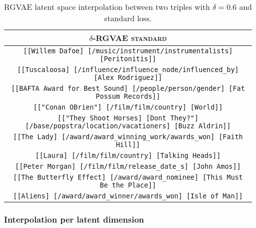 \begin{table}[H]
    \centering
    \begin{tabular}{|c|}
    \hline
    \rowcolor[HTML]{EFEFEF} 
    \textsc{$\delta$-RGVAE standard}\\ \hline
    \texttt{[[Willem Dafoe] [/music/instrument/instrumentalists] [Peritonitis]]}\\
    \texttt{[[Tuscaloosa] [/influence/influence\_node/influenced\_by] [Alex Rodriguez]]}\\
    \texttt{[[BAFTA Award for Best Sound] [/people/person/gender] [Fat Possum Records]]}\\
    \texttt{[["Conan OBrien"] [/film/film/country] [World]]}\\
    \texttt{[["They Shoot Horses] [Dont They?"] [/base/popstra/location/vacationers] [Buzz Aldrin]]}\\
    \texttt{[[The Lady] [/award/award\_winning\_work/awards\_won] [Faith Hill]]}\\
    \texttt{[[Laura] [/film/film/country] [Talking Heads]]}\\
    \texttt{[[Peter Morgan] [/film/film/release\_date\_s] [John Amos]]}\\
    \texttt{[[The Butterfly Effect] [/award/award\_nominee] [This Must Be the Place]]}\\
    \texttt{[[Aliens] [/award/award\_winner/awards\_won] [Isle of Man]]}\\
    \hline
    \end{tabular}
\caption{RGVAE latent space interpolation between two triples with $\delta = 0.6$ and standard loss.}
\label{annexA:ipbtw2DeltaNoPerm}
\end{table}


\subsubsection{Interpolation per latent dimension}
\label{annexB:95}

